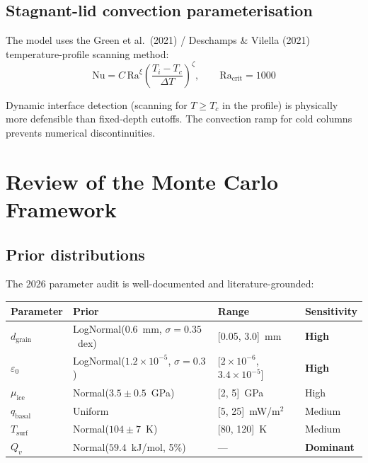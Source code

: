 \documentclass[11pt,a4paper]{article}
\begin{document}
\subsection{Stagnant-lid convection parameterisation}

The model uses the Green et al.\ (2021) / Deschamps \& Vilella (2021)
temperature-profile scanning method:
\begin{equation}
\mathrm{Nu} = C\,\mathrm{Ra}^\xi
  \left(\frac{T_i - T_c}{\Delta T}\right)^\zeta, \qquad
\mathrm{Ra}_\mathrm{crit} = 1000
\end{equation}

\begin{strength}
Dynamic interface detection (scanning for $T \geq T_c$ in the profile)
is physically more defensible than fixed-depth cutoffs. The convection
ramp for cold columns prevents numerical discontinuities.
\end{strength}

\section{Review of the Monte Carlo Framework}

\subsection{Prior distributions}

The 2026 parameter audit is well-documented and literature-grounded:

\begin{center}
\begin{tabular}{llll}
\toprule
\textbf{Parameter} & \textbf{Prior} & \textbf{Range} & \textbf{Sensitivity} \\
\midrule
$d_\mathrm{grain}$ & LogNormal(0.6~mm, $\sigma=0.35$~dex) & [0.05, 3.0]~mm & \textbf{High} \\
$\varepsilon_0$ & LogNormal($1.2\times10^{-5}$, $\sigma=0.3$) & [$2\times10^{-6}$, $3.4\times10^{-5}$] & \textbf{High} \\
$\mu_\mathrm{ice}$ & Normal($3.5\pm0.5$~GPa) & [2, 5]~GPa & High \\
$q_\mathrm{basal}$ & Uniform & [5, 25]~mW/m$^2$ & Medium \\
$T_\mathrm{surf}$ & Normal($104\pm7$~K) & [80, 120]~K & Medium \\
$Q_v$ & Normal($59.4$~kJ/mol, 5\%) & --- & \textbf{Dominant} \\
\bottomrule
\end{tabular}
\end{center}
\end{document}
